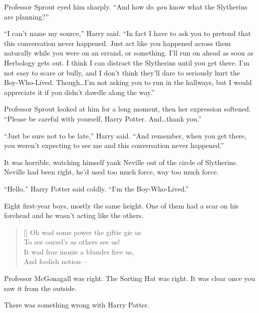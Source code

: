 \later

Professor Sprout eyed him sharply. “And how do \emph{you} know what the Slytherins are planning?”

“I can’t name my source,” Harry said. “In fact I have to ask you to pretend that this conversation never happened. Just act like you happened across them naturally while you were on an errand, or something. I’ll run on ahead as soon as Herbology gets out. I think I can distract the Slytherins until you get there. I’m not easy to scare or bully, and I don’t think they’ll dare to seriously hurt the Boy-Who-Lived. Though…I’m not asking you to run in the hallways, but I would appreciate it if you didn’t dawdle along the way.”

Professor Sprout looked at him for a long moment, then her expression softened. “Please be careful with yourself, Harry Potter. And…thank you.”

“Just be sure not to be late,” Harry said. “And remember, when you get there, you weren’t expecting to see me and this conversation never happened.”

\later

It was horrible, watching himself yank Neville out of the circle of Slytherins. Neville had been right, he’d used too much force, way too much force.

“Hello,” Harry Potter said coldly. “I’m the Boy-Who-Lived.”

Eight first-year boys, mostly the same height. One of them had a scar on his forehead and he wasn’t acting like the others.

\baselineskip\settowidth{\versewidth}{It wad frae monie a blunder free us,}
\begin{verse}[\versewidth]
Oh wad some power the giftie gie us\\
To see oursel’s as others see us!\\
It wad frae monie a blunder free us,\\
And foolish notion—
\end{verse}

Professor McGonagall was right. The Sorting Hat was right. It was clear once you saw it from the outside.

There was something wrong with Harry Potter.

